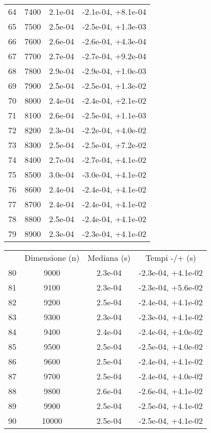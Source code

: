 \begin{table}
\begin{adjustbox}{width=1\textwidth/2}
\begin{tabular}{|c|c|c|c|}
\cline{1-4}
64 & 7400 & 2.1e-04 & -2.1e-04, +8.1e-04 \\
\cline{1-4}
65 & 7500 & 2.5e-04 & -2.5e-04, +1.3e-03 \\
\cline{1-4}
66 & 7600 & 2.6e-04 & -2.6e-04, +4.3e-04 \\
\cline{1-4}
67 & 7700 & 2.7e-04 & -2.7e-04, +9.2e-04 \\
\cline{1-4}
68 & 7800 & 2.9e-04 & -2.9e-04, +1.0e-03 \\
\cline{1-4}
69 & 7900 & 2.5e-04 & -2.5e-04, +1.3e-02 \\
\cline{1-4}
70 & 8000 & 2.4e-04 & -2.4e-04, +2.1e-02 \\
\cline{1-4}
71 & 8100 & 2.6e-04 & -2.5e-04, +1.1e-03 \\
\cline{1-4}
72 & 8200 & 2.3e-04 & -2.2e-04, +4.0e-02 \\
\cline{1-4}
73 & 8300 & 2.5e-04 & -2.5e-04, +7.2e-02 \\
\cline{1-4}
74 & 8400 & 2.7e-04 & -2.7e-04, +4.1e-02 \\
\cline{1-4}
75 & 8500 & 3.0e-04 & -3.0e-04, +4.1e-02 \\
\cline{1-4}
76 & 8600 & 2.4e-04 & -2.4e-04, +4.1e-02 \\
\cline{1-4}
77 & 8700 & 2.4e-04 & -2.4e-04, +4.1e-02 \\
\cline{1-4}
78 & 8800 & 2.5e-04 & -2.4e-04, +4.1e-02 \\
\cline{1-4}
79 & 8900 & 2.3e-04 & -2.3e-04, +4.1e-02 \\
\cline{1-4}
\end{tabular}
\end{adjustbox}
\end{table}

\begin{table}
\centering
\begin{adjustbox}{width=1\textwidth/2}
\begin{tabular}{|c|c|c|c|}
\hline
 & Dimensione (n) & Mediana (s) & Tempi -/+ (s) \\
80 & 9000 & 2.3e-04 & -2.3e-04, +4.1e-02 \\
\cline{1-4}
81 & 9100 & 2.3e-04 & -2.3e-04, +5.6e-02 \\
\cline{1-4}
82 & 9200 & 2.5e-04 & -2.4e-04, +4.1e-02 \\
\cline{1-4}
83 & 9300 & 2.3e-04 & -2.3e-04, +4.1e-02 \\
\cline{1-4}
84 & 9400 & 2.4e-04 & -2.4e-04, +4.0e-02 \\
\cline{1-4}
85 & 9500 & 2.5e-04 & -2.5e-04, +4.0e-02 \\
\cline{1-4}
86 & 9600 & 2.5e-04 & -2.4e-04, +4.1e-02 \\
\cline{1-4}
87 & 9700 & 2.5e-04 & -2.4e-04, +4.0e-02 \\
\cline{1-4}
88 & 9800 & 2.6e-04 & -2.6e-04, +4.1e-02 \\
\cline{1-4}
89 & 9900 & 2.5e-04 & -2.5e-04, +4.1e-02 \\
\cline{1-4}
90 & 10000 & 2.5e-04 & -2.5e-04, +4.1e-02 \\
\cline{1-4}
\end{tabular}
\end{adjustbox}
\end{table}
